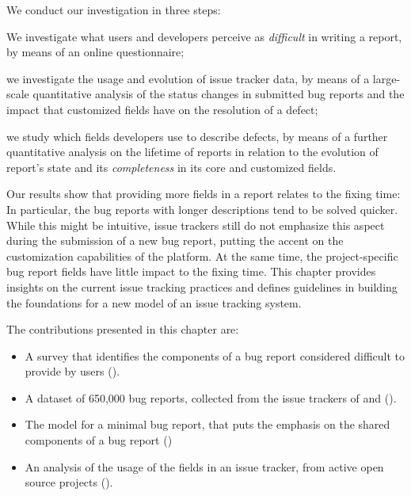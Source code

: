 
We conduct our investigation in three steps: \begin{inparaenum}[(1)]
\item We investigate what users and developers perceive as \emph{difficult} in writing a report, by means of an online questionnaire;
\item we investigate the usage and evolution of issue tracker data, by means of a large-scale quantitative analysis of the status changes in submitted bug reports and the impact that customized fields have on the resolution of a defect;
\item we study which fields developers use to describe defects, by means of a further quantitative analysis on the lifetime of reports in relation to the evolution of report's state and its \emph{completeness} in its core and customized fields.
\end{inparaenum}

Our results show that providing more fields in a report relates to the fixing time: In particular, the bug reports with longer descriptions tend to be solved quicker.
While this might be intuitive, issue trackers still do not emphasize this aspect during the submission of a new bug report, putting the accent on the customization capabilities of the platform.
At the same time, the project-specific bug report fields have little impact to the fixing time.
This chapter provides insights on the current issue tracking practices and defines guidelines in building the foundations for a new model of an issue tracking system.

\newpage
The contributions presented in this chapter are:

\begin{itemize}[$\circ$]

\item A survey that identifies the components of a bug report considered difficult to provide by users ().

\item A dataset of 650,000 bug reports, collected from the issue trackers of \bzilla and \jira ().

\item The model for a minimal bug report, that puts the emphasis on the shared components of a bug report ()

\item An analysis of the usage of the fields in an issue tracker, from active open source projects ().

\end{itemize}




